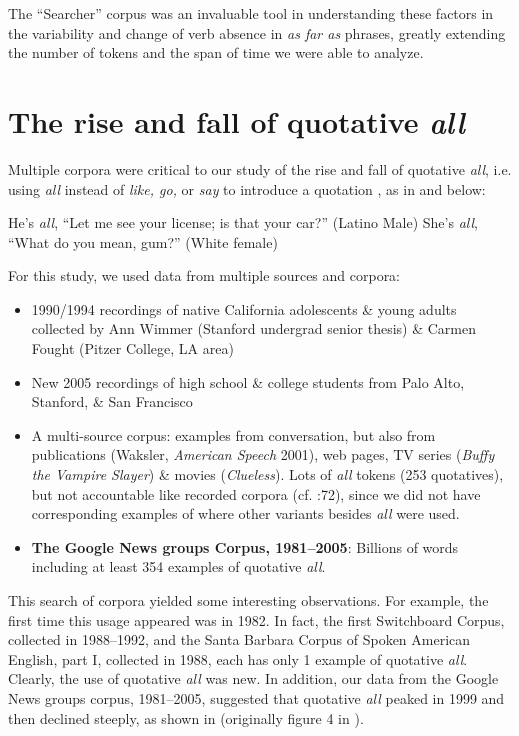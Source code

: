 \documentclass[output=paper,colorlinks,citecolor=brown]{langscibook}
\begin{document}
The “Searcher” corpus was an invaluable tool in understanding these factors in the variability and change of verb absence in \textit{as far as} phrases, greatly extending the number of tokens and the span of time we were able to analyze.
 

\section{The rise and fall of quotative \textit{all}}
Multiple corpora were critical to our study of the rise and fall of quotative \textit{all}, i.e. using \textit{all} instead of \textit{like, go,} or \textit{say} to introduce a quotation \citep{RickfordZwicky2007}, as in  and  below:

\ea \label{ex 6:rickford:6} 
He's \textit{all}, “Let me see your license; is that your car?” (Latino Male)
\ex\label{ex 7:rickford:7}  
She's \textit{all}, “What do you mean, gum?” (White female)
\z

For this study, we used data from multiple sources and corpora:

\begin{itemize}\sloppy
\item  1990/1994 recordings of native California adolescents \& young adults collected by Ann Wimmer (Stanford undergrad senior thesis) \& Carmen Fought (Pitzer College, LA area) 
\item  New 2005 recordings of high school \& college students from Palo Alto, Stanford, \& San Francisco 
\item  A multi-source corpus: examples from conversation, but also from publications (Waksler, \textit{American Speech} 2001), web pages, TV series (\textit{Buffy the Vampire Slayer}) \& movies (\textit{Clueless}). Lots of \textit{all} tokens (253 quotatives), but not accountable like recorded corpora (cf. \citealt{Labov1972}:72), since we did not have corresponding examples of where other variants besides \textit{all} were used.
\item \textbf{The Google News groups Corpus, 1981--2005}: Billions  of  words including at least 354 examples of quotative \textit{all}. 
\end{itemize}

This search of corpora yielded some interesting observations. For example, the first time this usage appeared was in 1982. In fact, the first Switchboard Corpus, collected in 1988--1992, and the Santa Barbara Corpus of Spoken American English, part I, collected in 1988, each has only 1 example of quotative \textit{all}.  Clearly, the use of quotative \textit{all} was new. In addition, our data from the Google News groups corpus, 1981--2005, suggested that quotative \textit{all} peaked in 1999 and then declined steeply, as shown in  (originally figure 4 in \citealt{RickfordZwicky2007}).
\end{document}
